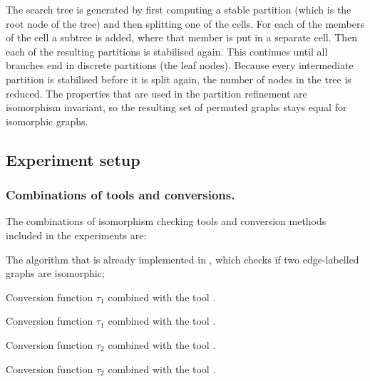 The search tree is generated by first computing a stable partition (which is the
root node of the tree) and then splitting one of the cells. For each of the
members of the cell a subtree is added, where that member is put in a separate
cell. Then each of the resulting partitions is stabilised again. This continues
until all branches end in discrete partitions (the leaf nodes). Because every
intermediate partition is stabilised before it is split again, the number of
nodes in the tree is reduced. The properties that are used in the partition
refinement are isomorphism invariant, so the resulting set of permuted graphs
stays equal for isomorphic graphs.

\subsection{Experiment setup}

\subsubsection{Combinations of tools and conversions.}
The combinations of isomorphism checking tools and conversion methods included
in the experiments are:
\begin{description}\itemsep0pt
\item[\GROOVE] The algorithm that is already implemented in \GROOVE, which
checks if two edge-labelled graphs are isomorphic;
\item[Layered-\BLISS] Conversion function $\tau_1$ combined with the tool
\BLISS.
\item[Layered-\NAUTY] Conversion function $\tau_1$ combined with the tool
\NAUTY.
\item[Edgenode-\BLISS] Conversion function $\tau_2$ combined with the tool
\BLISS.
\item[Edgenode-\NAUTY] Conversion function $\tau_2$ combined with the tool
\NAUTY.
\end{description}

